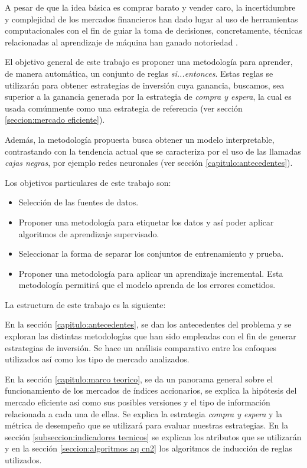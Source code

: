 \documentclass[12pt]{report}
\theoremstyle{break}
\theoremstyle{break}
\begin{document}
A pesar de que la idea básica es comprar barato y vender caro, la incertidumbre y complejidad de los mercados financieros han dado lugar al uso de herramientas computacionales con el fin de guiar la toma de decisiones, concretamente, técnicas relacionadas al aprendizaje de máquina han ganado notoriedad \cite{AdvancesMLFinance}.

El objetivo general de este trabajo es proponer una metodología para aprender, de manera automática, un conjunto de reglas \textit{si...entonces}. Estas reglas se utilizarán para obtener estrategias de inversión cuya ganancia, buscamos, sea superior a la ganancia generada por la estrategia de \textit{compra y espera}, la cual es usada comúnmente como una estrategia de referencia (ver sección \ref{seccion:mercado eficiente}).

Además, la metodología propuesta busca obtener un modelo interpretable, contrastando con la tendencia actual que se caracteriza por el uso de las llamadas \textit{cajas negras}, por ejemplo redes neuronales (ver sección \ref{capitulo:antecedentes}).

Los objetivos particulares de este trabajo son:
\begin{itemize}

\item Selección de las fuentes de datos.

\item Proponer una metodología para etiquetar los datos y así poder aplicar algoritmos de aprendizaje supervisado.

\item Seleccionar la forma de separar los conjuntos de entrenamiento y prueba.

\item Proponer una metodología para aplicar un aprendizaje incremental. Esta metodología permitirá que el modelo aprenda de los errores cometidos.
\end{itemize}

La estructura de este trabajo es la siguiente:

En la sección \ref{capitulo:antecedentes}, se dan los antecedentes del problema y se exploran las distintas metodologías que han sido empleadas con el fin de generar estrategias de inversión. Se hace un análisis comparativo entre los enfoques utilizados así como los tipo de mercado analizados.

En la sección \ref{capitulo:marco teorico}, se da un panorama general sobre el funcionamiento de los mercados de índices accionarios, se explica la hipótesis del mercado eficiente así como sus posibles versiones y el tipo de información relacionada a cada una de ellas. Se explica la estrategia \textit{compra y espera} y la métrica de desempeño que se utilizará para evaluar nuestras estrategias. En la sección \ref{subseccion:indicadores tecnicos} se explican los atributos que se utilizarán y en la sección \ref{seccion:algoritmos aq cn2} los algoritmos de inducción de reglas utilizados.
\end{document}
